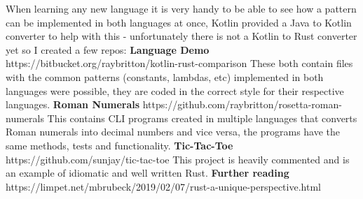 \documentclass[a4paper,11pt]{article}
\begin{document}
When learning any new language it is very handy to be able to see how a pattern can be implemented in both languages at once, Kotlin provided a Java to Kotlin converter to help with this - unfortunately there is not a Kotlin to Rust converter yet so I created a few repos:
\medskip
\newline
\textbf{Language Demo}
\newline
https://bitbucket.org/raybritton/kotlin-rust-comparison
\newline
These both contain files with the common patterns (constants, lambdas, etc) implemented in both languages were possible, they are coded in the correct style for their respective languages. 
\newline
\newline
\textbf{Roman Numerals}
\newline
https://github.com/raybritton/rosetta-roman-numerals
\newline
This contains CLI programs created in multiple languages that converts Roman numerals into decimal numbers and vice versa, the programs have the same methods, tests and functionality.
\newline
\newline
\textbf{Tic-Tac-Toe}
\newline
https://github.com/sunjay/tic-tac-toe
\newline
This project is heavily commented and is an example of idiomatic and well written Rust.
\medskip
\medskip
\newline
\textbf{Further reading}
\newline
https://limpet.net/mbrubeck/2019/02/07/rust-a-unique-perspective.html
\end{document}
